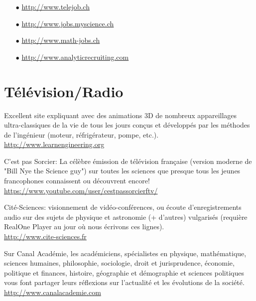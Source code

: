 	\begin{itemize}	 
		\item[$\bullet$] \href{http://www.telejob.ch}{\color{blue}http://www.telejob.ch} 
	
		\item[$\bullet$] \href{http://www.jobs.myscience.ch}{\color{blue}http://www.jobs.myscience.ch}
	
		\item[$\bullet$] \href{http://www.math-jobs.ch}{\color{blue}http://www.math-jobs.ch}
	
		\item[$\bullet$] \href{http://www.analyticrecruiting.com}{\color{blue}http://www.analyticrecruiting.com}
	\end{itemize}
	
	\section{Télévision/Radio}

	{\Large {}} Excellent site expliquant avec des animations 3D de nombreux appareillages ultra-classiques de la vie de tous les jours conçus et développés par les méthodes de l'ingénieur (moteur, réfrigérateur, pompe, etc.).\\
	\href{http://www.learnengineering.org}{\color{blue}http://www.learnengineering.org}
	
	\bcdfrance{} C'est pas Sorcier: La célèbre émission de télévision française (version moderne de "Bill Nye the Science guy") sur toutes les sciences que presque tous les jeunes francophones connaissent ou découvrent encore!\\
	\href{https://www.youtube.com/user/cestpassorcierftv/}{\color{blue}https://www.youtube.com/user/cestpassorcierftv/}
	
	\bcdfrance{} Cité-Sciences: visionnement de vidéo-conférences, ou écoute d'enregistrements audio sur des sujets de physique et astronomie (+ d'autres) vulgarisés (requière RealOne Player au jour où nous écrivons ces lignes).\\
	\href{http://www.cite-sciences.fr}{\color{blue}http://www.cite-sciences.fr}
	
	\bcdfrance{} Sur Canal Académie, les académiciens, spécialistes en physique, mathématique, sciences humaines, philosophie, sociologie, droit et jurisprudence, économie, politique et finances, histoire, géographie et démographie et sciences politiques vous font partager leurs réflexions sur l'actualité et les évolutions de la société.\\
	\href{http://www.canalacademie.com}{\color{blue}http://www.canalacademie.com}
	
